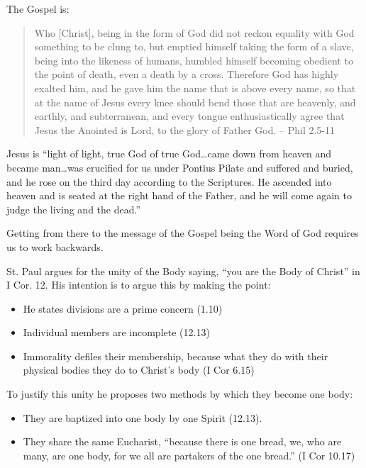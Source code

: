 \documentclass{beamer}
\begin{document}
\begin{frame}
  The Gospel is:
  \begin{quote}
	Who [Christ], being in the form of God did not reckon equality with God something to be clung to,
	but emptied himself taking the form of a slave, being into the likeness of humans,
	humbled himself becoming obedient to the point of death, even a death by a cross.
	Therefore God has highly exalted him, and he gave him the name that is above every name,
	so that at the name of Jesus every knee should bend those that are heavenly, and earthly, and subterranean,
	and  every tongue enthusiastically agree that Jesus the Anointed is Lord, to the glory of Father God. -- Phil 2.5-11
  \end{quote}
\end{frame}

\begin{frame}
  Jesus is ``light of light, true God of true God\ldots came down from heaven and became man\ldots was crucified for us under Pontius Pilate and suffered and buried, and he rose on the third day according to the Scriptures.
  He ascended into heaven and is seated at the right hand of the Father, and he will come again to judge the living and the dead.''
\end{frame}

\begin{frame}
  Getting from there to the message of the Gospel being the Word of God requires us to work backwards.
\end{frame}

\begin{frame}
  St. Paul argues for the unity of the Body saying, ``you are the Body of Christ'' in I Cor. 12.
  His intention is to argue this by making the point:\pause
  \begin{itemize}
	\item He states divisions are a prime concern (1.10)\pause
	\item Individual members are incomplete (12.13)\pause
	\item Immorality defiles their membership, because what they do with their physical bodies they do to Christ's body (I Cor 6.15)\pause
  \end{itemize}
\end{frame}

\begin{frame}
  To justify this unity he proposes two methods by which they become one body:\pause
  \begin{itemize}
	\item They are baptized into one body by one Spirit (12.13).\pause
	\item They share the same Eucharist, ``because there is one bread, we, who are many, are one body, for we all are partakers of the one bread.'' (I Cor 10.17)
  \end{itemize}
\end{frame}
\end{document}
